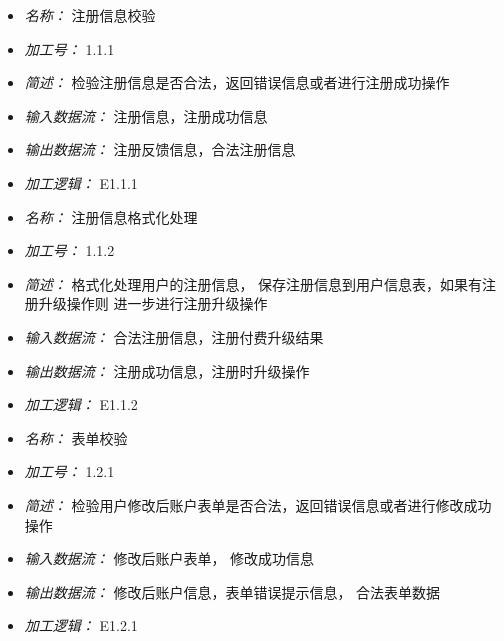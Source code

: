 \vspace{-1mm}


\begin{itemize}
\item \textit{名称： } 注册信息校验
\item \textit{加工号： } 1.1.1
\item \textit{简述： } 检验注册信息是否合法，返回错误信息或者进行注册成功操作 
\item \textit{输入数据流： } 注册信息，注册成功信息
\item \textit{输出数据流： } 注册反馈信息，合法注册信息
\item \textit{加工逻辑： } E1.1.1

\end{itemize}


\vspace{-1mm}


\begin{itemize}
\item \textit{名称： } 注册信息格式化处理
\item \textit{加工号： } 1.1.2
\item \textit{简述： } 格式化处理用户的注册信息， 保存注册信息到用户信息表，如果有注册升级操作则 进一步进行注册升级操作
\item \textit{输入数据流： } 合法注册信息，注册付费升级结果
\item \textit{输出数据流： } 注册成功信息，注册时升级操作
\item \textit{加工逻辑： } E1.1.2

\end{itemize}


\vspace{-1mm}


\begin{itemize}
\item \textit{名称： } 表单校验
\item \textit{加工号： } 1.2.1
\item \textit{简述： } 检验用户修改后账户表单是否合法，返回错误信息或者进行修改成功操作 
\item \textit{输入数据流： } 修改后账户表单， 修改成功信息
\item \textit{输出数据流： } 修改后账户信息，表单错误提示信息， 合法表单数据
\item \textit{加工逻辑： } E1.2.1

\end{itemize}


\vspace{-1mm}


